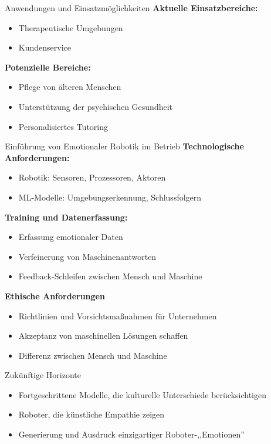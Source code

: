 \documentclass[aspectratio=169]{beamer}
\begin{document}
\begin{frame}{Anwendungen und Einsatzmöglichkeiten}
  \textbf{Aktuelle Einsatzbereiche:}
  \begin{itemize}
      \item Therapeutische Umgebungen
      \item Kundenservice
  \end{itemize}

  \textbf{Potenzielle Bereiche:}
  \begin{itemize}
      \item Pflege von älteren Menschen
      \item Unterstützung der psychischen Gesundheit
      \item Personalisiertes Tutoring
  \end{itemize}
\end{frame}

\begin{frame}{Einführung von Emotionaler Robotik im Betrieb}
  \textbf{Technologische Anforderungen:}
  \begin{itemize}
      \item Robotik: Sensoren, Prozessoren, Aktoren 
      \item ML-Modelle: Umgebungserkennung, Schlussfolgern
  \end{itemize}
  \textbf{Training und Datenerfassung:}
  \begin{itemize}
      \item Erfassung emotionaler Daten
      \item Verfeinerung von Maschinenantworten
      \item Feedback-Schleifen zwischen Mensch und Maschine
  \end{itemize}

  \textbf{Ethische Anforderungen}
  \begin{itemize}
      \item Richtlinien und Vorsichtsmaßnahmen für Unternehmen
      \item Akzeptanz von maschinellen Lösungen schaffen
      \item Differenz zwischen Mensch und Maschine
  \end{itemize}
\end{frame}

\begin{frame}{Zukünftige Horizonte}
  \begin{itemize}
      \item Fortgeschrittene Modelle, die kulturelle Unterschiede berücksichtigen
      \item Roboter, die künstliche Empathie zeigen
      \item Generierung und Ausdruck einzigartiger Roboter-,,Emotionen''
  \end{itemize}
\end{frame}
\end{document}
